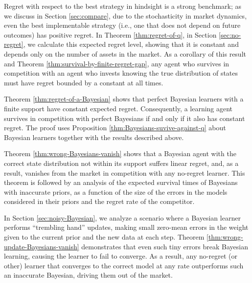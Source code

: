 Regret with respect to the best strategy in hindsight is a strong benchmark; as we discuss in Section \ref{sec:compare}, due to the stochasticity in market dynamics, even the best implementable strategy (i.e., one that does not depend on future outcomes) has positive regret. In Theorem \ref{thm:regret-of-q}, in Section \ref{sec:no-regret}, we calculate this expected regret level, showing that it is constant and depends only on the number of assets in the market. As a corollary of this result and Theorem \ref{thm:survival-by-finite-regret-gap}, any agent who survives in competition with an agent who invests knowing the true distribution of states must have regret bounded by a constant at all times. 

Theorem \ref{thm:regret-of-a-Bayesian} shows that perfect Bayesian learners with a finite support have constant expected regret.  
Consequently, a learning agent survives in competition with perfect Bayesians if and only if it also has constant regret.  
The proof uses Proposition \ref{thm:Bayesians-suvive-against-q} about Bayesian learners together with the results described above.  

Theorem \ref{thm:wrong-Bayesians-vanish} shows that a Bayesian agent with the correct state distribution not within its support suffers linear regret, and, as a result, vanishes from the market in competition with any no-regret learner.  
This theorem is followed by an analysis of the expected survival times of Bayesians with inaccurate priors, as a function of the size of the errors in the models considered in their priors and the regret rate of the competitor.  

In Section \ref{sec:noisy-Bayesian}, we analyze a scenario where a Bayesian learner performs ``trembling hand'' updates, making small zero-mean errors in the weight given to the current prior and the new data at each step.  
Theorem \ref{thm:wrong-update-Bayesians-vanish} demonstrates that even such tiny errors break Bayesian learning, causing the learner to fail to converge.  
As a result, any no-regret (or other) learner that converges to the correct model at any rate outperforms such an inaccurate Bayesian, driving them out of the market.  
\vspace{5pt}
